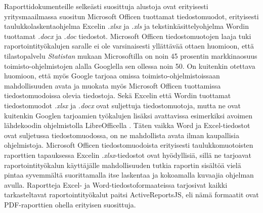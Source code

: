 Raporttidokumenteille selkeästi suosittuja alustoja ovat erityisesti yritysmaailmassa suositun Microsoft Officen tuottamat tiedostomuodot, erityisesti taulukkolaskentaohjelma Excelin \textit{.xlsx} ja \textit{.xls} ja tekstinkäsittelyohjelma Wordin tuottamat \textit{.docx} ja \textit{.doc} tiedostot. Microsoft Officen tiedostomuotojen laaja tuki raportointityökalujen saralle ei ole varsinaisesti yllättävää ottaen huomioon, että tilastopalvelu \textit{Statistan} mukaan Microsoftilla on noin 45 prosentin markkinaosuus toimisto-ohjelmistojen alalla Googlella sen ollessa noin 50. \cite{office} On kuitenkin otettava huomioon, että myös Google tarjoaa omissa toimisto-ohjelmistoissaan mahdollisuuden avata ja muokata myös Microsoft Officen tuottamissa tiedostomuodoissa olevia tiedostoja. Sekä Excelin että Wordin tuottamat tiedostomuodot \textit{.xlsx} ja \textit{.docx} ovat suljettuja tiedostomuotoja, mutta ne ovat kuitenkin Googlen tarjoamien työkalujen lisäksi avattavissa esimerkiksi avoimen lähdekoodin ohjelmistolla LibreOfficella \cite{libreoffice}. Täten vaikka Word ja Excel-tiedostot ovat suljetussa tiedostomuodossa, on ne mahdollista avata ilman kaupallisia ohjelmistoja. Microsoft Officen tiedostomuodoista erityisesti taulukkomuotoisten raporttien tapauksessa Excelin \textit{.xlsx}-tiedostot ovat hyödyllisiä, sillä ne tarjoavat raportointityökalun käyttäjälle mahdollisuuden tutkia raportin sisältöä vielä pintaa syvemmältä suorittamalla itse laskentaa ja kokoamalla kuvaajia ohjelman avulla. Raportteja Excel- ja Word-tiedostoformaateissa tarjosivat kaikki tarkasteltavat raportointityökalut paitsi ActiveReportsJS, eli nämä formaatit ovat PDF-raporttien ohella erityisen suosittuja.

